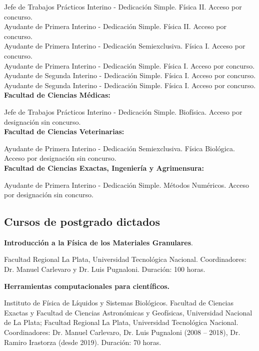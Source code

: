  Jefe de Trabajos Prácticos Interino - Dedicación Simple. Física II. Acceso por concurso.\\
 Ayudante de Primera Interino - Dedicación Simple. Física II. Acceso por concurso. \\
 Ayudante de Primera Interino - Dedicación Semiexclusiva. Física I. Acceso por concurso. \\
 Ayudante de Primera Interino - Dedicación Simple. Física I. Acceso por concurso. \\
 Ayudante de Segunda Interino - Dedicación Simple. Física I. Acceso por concurso. \\
 Ayudante de Segunda Interino - Dedicación Simple. Física I. Acceso por concurso. \\

\textbf{Facultad de Ciencias Médicas:}

 Jefe de Trabajos Prácticos Interino - Dedicación Simple. Biofísica. Acceso por designación sin concurso. \\

\textbf{Facultad de Ciencias Veterinarias:}

 Ayudante de Primera Interino - Dedicación Semiexclusiva. Física Biológica. Acceso por designación sin concurso.\\

\textbf{Facultad de Ciencias Exactas, Ingeniería y Agrimensura:}

 Ayudante de Primera Interino - Dedicación Simple. Métodos Numéricos. Acceso por designación sin concurso.

\subsection{Cursos de postgrado dictados}

 \textbf{Introducción a la Física de los Materiales Granulares}. 

Facultad Regional La Plata, Universidad Tecnológica Nacional. Coordinadores: Dr. Manuel Carlevaro y Dr. Luis Pugnaloni. Duración: 100 horas.

 \textbf{Herramientas computacionales para científicos.}

 Instituto de Física de Líquidos y Sistemas Biológicos. Facultad de Ciencias Exactas y Facultad de Ciencias Astronómicas y Geofísicas, Universidad Nacional de La Plata; Facultad Regional La Plata, Universidad Tecnológica Nacional. Coordinadores: Dr. Manuel Carlevaro, Dr. Luis Pugnaloni (2008 -- 2018), Dr. Ramiro Irastorza (desde 2019). Duración: 70 horas.


